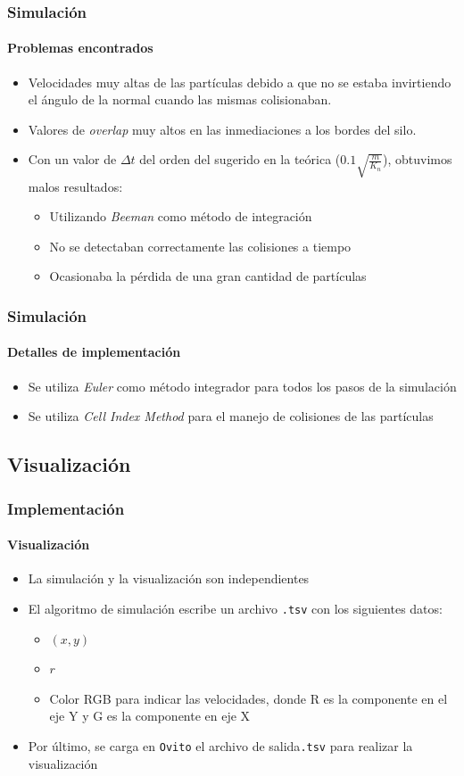 \documentclass[hyperref={pdfpagelayout=SinglePage}]{beamer}
\begin{document}
\begin{frame}
\frametitle{Simulación}
\framesubtitle{Problemas encontrados}
\begin{itemize}
	\item Velocidades muy altas de las partículas debido a que no se estaba invirtiendo el ángulo de la normal cuando las mismas colisionaban.
	\item Valores de \textit{overlap} muy altos en las inmediaciones a los bordes del silo.
	\item Con un valor de $\Delta t$ del orden del sugerido en la teórica ($0.1 \sqrt{\frac{m}{K_{n}}}$), obtuvimos malos resultados:
	\begin{itemize}
		\item Utilizando \textit{Beeman} como método de integración
		\item No se detectaban correctamente las colisiones a tiempo
		\item Ocasionaba la pérdida de una gran cantidad de partículas
	\end{itemize}
\end{itemize}
\end{frame}

\begin{frame}
\frametitle{Simulación}
\framesubtitle{Detalles de implementación}
\begin{itemize}
	\item Se utiliza \textit{Euler} como método integrador para todos los pasos de la simulación
	\item Se utiliza \textit{Cell Index Method} para el manejo de colisiones de las partículas 
\end{itemize}
\end{frame}

\subsection{Visualización}

\begin{frame}
\frametitle{Implementación}
\framesubtitle{Visualización}
\begin{itemize}
	\item La simulación y la visualización son independientes
	\item El algoritmo de simulación escribe un archivo \texttt{.tsv} con los siguientes datos:
	\begin{itemize}
		\item $(x,y)$
		\item $r$
		\item Color RGB para indicar las velocidades, donde R es la componente en el eje Y y G es la componente en eje X
	\end{itemize}
	\item Por último, se carga en \texttt{Ovito} el archivo de salida\texttt{.tsv} para realizar la visualización
\end{itemize}
\end{frame}
\end{document}
